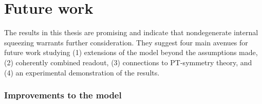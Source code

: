 \section{Future work}
\label{sec:future_work}


The results in this thesis are promising and indicate that nondegenerate internal squeezing warrants further consideration. They suggest four main avenues for future work studying (1) extensions of the model beyond the assumptions made, (2) coherently combined readout, (3) connections to PT-symmetry theory, and (4) an experimental demonstration of the results.

\subsubsection{Improvements to the model} %


